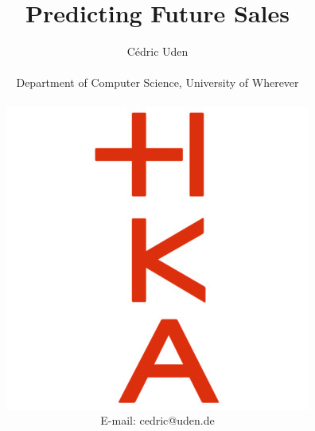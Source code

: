 
\title{Predicting Future Sales}



\author
{Cédric Uden\\
\\
\normalsize{Department of Computer Science, University of Wherever}\\
\\
\includegraphics[width=0.5\linewidth]{external_content/media/hka-logo-vert.png}
\\
\normalsize{E-mail: cedric@uden.de}
}


\date{}
